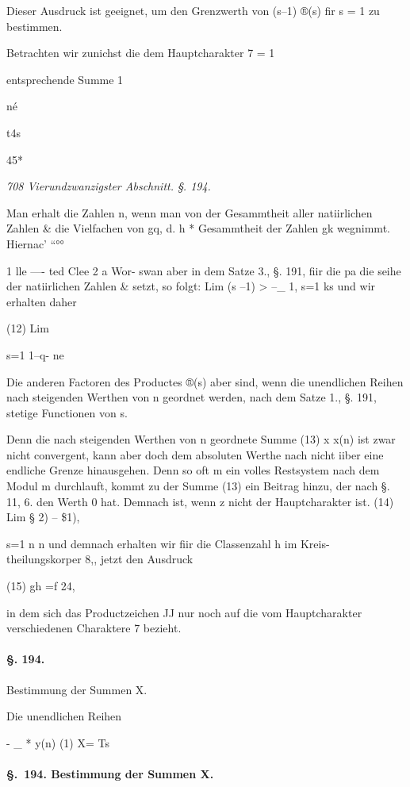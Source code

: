 \documentclass[12pt,a4paper]{article}
\theoremstyle{plain}
\theoremstyle{definition}
\begin{document}
Dieser Ausdruck ist geeignet, um den Grenzwerth von (s--1) ®(s) fir s = 1 zu bestimmen.

Betrachten wir zunichst die dem Hauptcharakter 7 = 1

entsprechende Summe 1

né

t4s

45*

\vspace{0.5\baselineskip}\noindent\textit{708 Vierundzwanzigster Abschnitt. §. 194.}\par

Man erhalt die Zahlen n, wenn man von der Gesammtheit aller natiirlichen Zahlen \& die Vielfachen von gq, d. h * Gesammtheit der Zahlen gk wegnimmt. Hiernac' ``°°

1 lle ---- ted Clee 2 a Wor- swan aber in dem Satze 3., §. 191, fiir die pa die seihe der natiirlichen Zahlen \& setzt, so folgt: Lim (s --1) > --\_ 1, s=1 ks und wir erhalten daher

(12) Lim

s=1 1--q- ne

Die anderen Factoren des Productes ®(s) aber sind, wenn die unendlichen Reihen nach steigenden Werthen von n geordnet werden, nach dem Satze 1., §. 191, stetige Functionen von s.

Denn die nach steigenden Werthen von n geordnete Summe (13) x x(n) ist zwar nicht convergent, kann aber doch dem absoluten Werthe nach nicht iiber eine endliche Grenze hinausgehen. Denn so oft m ein volles Restsystem nach dem Modul m durchlauft, kommt zu der Summe (13) ein Beitrag hinzu, der nach §. 11, 6. den Werth 0 hat. Demnach ist, wenn z nicht der Hauptcharakter ist. (14) Lim § 2) -- \$1),

s=1 n n und demnach erhalten wir fiir die Classenzahl h im Kreis- theilungskorper 8,, jetzt den Ausdruck

(15) gh =f 24,

in dem sich das Productzeichen JJ nur noch auf die vom Hauptcharakter verschiedenen Charaktere 7 bezieht.

\paragraph{§. 194.}

Bestimmung der Summen X.

Die unendlichen Reihen

- \_ * y(n) (1) X= Ts

\paragraph{\S.~194. Bestimmung der Summen X.}
\end{document}
